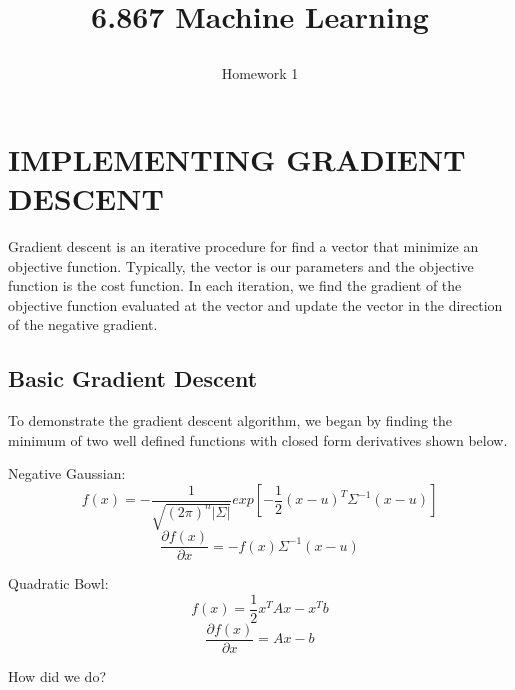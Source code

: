 \documentclass[a4paper,twoside]{article}
\begin{document}
\title{6.867 Machine Learning  \subtitle{Homework 1} }

\maketitle


\section{\uppercase{Implementing Gradient Descent}}

\noindent Gradient descent is an iterative procedure for find a vector that minimize an objective function. Typically, the vector is our parameters and the objective function is the cost function. In each iteration, we find the gradient of the objective function evaluated at the vector and update the vector in the direction of the negative gradient.

\subsection{Basic Gradient Descent}

\noindent To demonstrate the gradient descent algorithm, we began by finding the minimum of two well defined functions with closed form derivatives shown below.

\medskip
\noindent Negative Gaussian:
\begin{equation}
f(x) = - \frac{1}{\sqrt{(2\pi)^n |\Sigma|}} exp[-\frac{1}{2} (x-u)^T\Sigma^{-1}(x-u)]
\end{equation}
\begin{equation}
\frac{\partial f(x)}{\partial x} = -f(x) \Sigma^{-1} (x-u)
\end{equation}

\noindent Quadratic Bowl:
\begin{equation}
f(x) = \frac{1}{2} x^T A x - x^T b
\end{equation}
\begin{equation}
\frac{\partial f(x)}{\partial x} = Ax - b
\end{equation}

How did we do?
\end{document}
